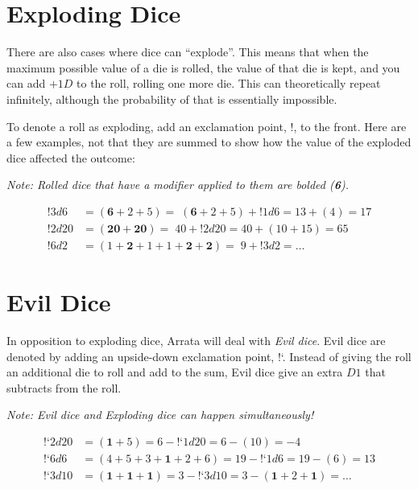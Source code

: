\documentclass[../main.tex]{subfiles}
\begin{document}
    \section{Exploding Dice}

    There are also cases where dice can ``explode''. This means that when the maximum possible value of a die is rolled, the value of that die is kept, and you can add $+1D$ to the roll, rolling one more die. This can theoretically repeat infinitely, although the probability of that is essentially impossible.

    To denote a roll as exploding, add an exclamation point, $!$, to the front. Here are a few examples, not that they are summed to show how the value of the exploded dice affected the outcome:
    
    \emph{Note: Rolled dice that have a modifier applied to them are bolded (\textbf{6}).}
    \vspace*{-0.325cm}
    \begin{mdframed}[style=Arrata]
        \begin{align*}
            !3d6    & = (\textbf{6} + 2 + 5) =\; (\textbf{6} + 2 + 5) + !1d6 = 13 + (4) = 17  \\
            !2d20   & = (\textbf{20} + \textbf{20}) =\; 40 + !2d20 = 40 + (10 + 15) = 65      \\
            !6d2    & = (1 + \textbf{2} + 1 + 1 + \textbf{2} + \textbf{2}) =\; 9 + !3d2  = \dots    
        \end{align*}
    \end{mdframed}

    \section{Evil Dice}

    In opposition to exploding dice, Arrata will deal with {\em Evil dice}. Evil dice are denoted by adding an upside-down exclamation point, !`. Instead of giving the roll an additional die to roll and add to the sum, Evil dice give an extra $D1$ that subtracts from the roll.

    \emph{Note: Evil dice and Exploding dice can happen simultaneously!}
    \begin{mdframed}[style=Arrata]
        \begin{align*}
            \text{!`}2d20  & = (\textbf{1} + 5) = 6 - \text{!`}1d20 = 6 - (10) = -4                  \\
            \text{!`}6d6   & = (4 + 5 + 3 + \textbf{1} + 2 + 6) = 19 -  \text{!`}1d6 = 19 - (6) = 13 \\
            \text{!`}3d10  & = (\textbf{1} + \textbf{1} + \textbf{1}) = 3 - \text{!`}3d10 = 3 - (\textbf{1} + 2 + \textbf{1}) = \ldots
        \end{align*}
    \end{mdframed}
\end{document}
